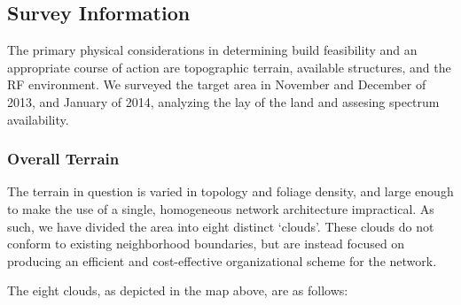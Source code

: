 \subsection{Survey Information}
The primary physical considerations in determining build feasibility and an
appropriate course of action are topographic terrain, available structures, and the RF environment. 
We surveyed the target area in November and December of 2013, and January of 2014,
 analyzing the lay of the land and assesing spectrum availability. \par
\subsubsection{Overall Terrain}
The terrain in question is varied in topology and foliage density, and large enough
to make the use of a single, homogeneous network architecture impractical. As such,
we have divided the area into eight distinct `clouds'. These clouds do not conform
to existing neighborhood boundaries, but are instead focused on producing an efficient 
and cost-effective organizational scheme for the network.   
\begin{center}
\end{center}
The eight clouds, as depicted in the map above, are as follows:
